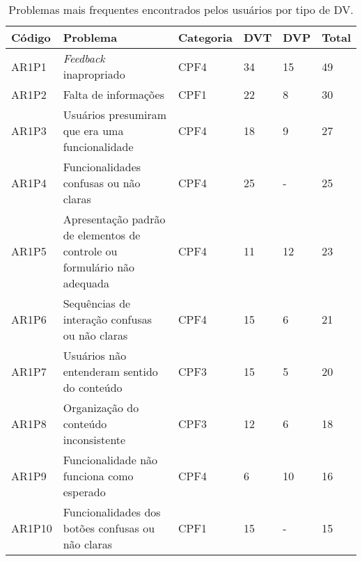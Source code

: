 \begin{table}[htb]
  \begin{center}
    \ABNTEXfontereduzida
    \caption{Problemas mais frequentes encontrados pelos usuários por tipo de DV.}
    \label{tab-pro-blind-1}
    \begin{tabular}{p{1.2cm}|p{8.7cm}|p{1.4cm}|p{0.6cm}|p{0.6cm}|p{0.7cm}}
      \textbf{Código} & \textbf{Problema}                                                       & \textbf{Categoria} & \textbf{DVT} & \textbf{DVP} & \textbf{Total} \\
      \hline
      AR1P1           & \emph{Feedback} inapropriado                                            & CPF4               & 34           & 15           & 49             \\
      \hline
      AR1P2           & Falta de informações                                                    & CPF1               & 22           & 8            & 30             \\
      \hline
      AR1P3           & Usuários presumiram que era uma funcionalidade                          & CPF4               & 18           & 9            & 27             \\
      \hline
      AR1P4           & Funcionalidades confusas ou não claras                                  & CPF4               & 25           & -            & 25             \\
      \hline
      AR1P5           & Apresentação padrão de elementos de controle ou formulário não adequada & CPF4               & 11           & 12           & 23             \\
      \hline
      AR1P6           & Sequências de interação confusas ou não claras                          & CPF4               & 15           & 6            & 21             \\
      \hline
      AR1P7           & Usuários não entenderam sentido do conteúdo                             & CPF3               & 15           & 5            & 20             \\
      \hline
      AR1P8           & Organização do conteúdo inconsistente                                   & CPF3               & 12           & 6            & 18             \\
      \hline
      AR1P9           & Funcionalidade não funciona como esperado                               & CPF4               & 6            & 10           & 16             \\
      \hline
      AR1P10          & Funcionalidades dos botões confusas ou não claras                       & CPF1               & 15           & -            & 15             \\

\end{tabular}
\end{center}
\end{table}
